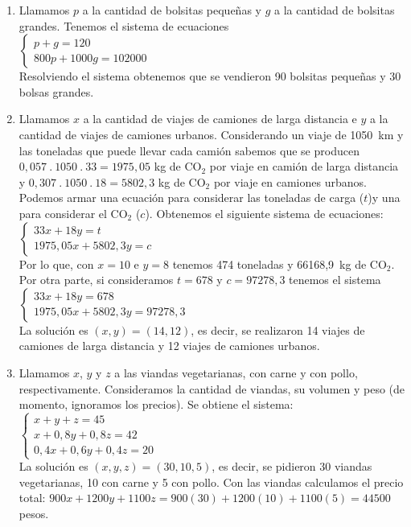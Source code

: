 \documentclass[a4paper]{article}
\begin{document}
\begin{enumerate}
\begin{enumerate} [label=(\alph*)]
		\item Llamamos $p$ a la cantidad de bolsitas pequeñas y $g$ a la cantidad de bolsitas grandes. Tenemos el sistema de ecuaciones \\ \vspace{2mm} $\left\{\begin{matrix} p+g=120 \\ 800p+1000g=102000 \end{matrix}\right.$ \\ Resolviendo el sistema obtenemos que se vendieron 90 bolsitas pequeñas y 30 bolsas grandes.
		\item Llamamos $x$ a la cantidad de viajes de camiones de larga distancia e $y$ a la cantidad de viajes de camiones urbanos. Considerando un viaje de 1050~km y las toneladas que puede llevar cada camión sabemos que se producen $0,057~.~1050~.~33=1975,05$ kg de CO$_2$ por viaje en camión de larga distancia y $0,307~.~1050~.~18=5802,3$ kg de CO$_2$ por viaje en camiones urbanos. Podemos armar una ecuación para considerar las toneladas de carga ($t$)y una para considerar el CO$_2$ ($c$). Obtenemos el siguiente sistema de ecuaciones: \\ \vspace{2mm} $\left\{\begin{matrix} 33x+18y=t \\ 1975,05x+5802,3y=c \end{matrix}\right.$ \\ Por lo que, con $x=10$ e $y=8$ tenemos 474 toneladas y 66168,9~kg de CO$_2$. Por otra parte, si consideramos $t=678$ y $c=97278,3$ tenemos el sistema \\ \vspace{2mm} $\left\{\begin{matrix} 33x+18y=678 \\ 1975,05x+5802,3y=97278,3 \end{matrix}\right.$ \\ La solución es $(x,y)=(14,12)$, es decir, se realizaron 14 viajes de camiones de larga distancia y 12 viajes de camiones urbanos.
		\item Llamamos $x$, $y$ y $z$ a las viandas vegetarianas, con carne y con pollo, respectivamente. Consideramos la cantidad de viandas, su volumen y peso (de momento, ignoramos los precios). Se obtiene el sistema: \\ \vspace{2mm} $\left\{\begin{matrix} x+y+z=45 \\ x+0,8y+0,8z=42 \\ 0,4x+0,6y+0,4z=20 \end{matrix}\right.$ \\ La solución es $(x,y,z)=(30,10,5)$, es decir, se pidieron 30 viandas vegetarianas, 10 con carne y 5 con pollo. Con las viandas calculamos el precio total: $900x+1200y+1100z=900(30)+1200(10)+1100(5)=44500$ pesos.

\end{enumerate}
\end{enumerate}
\end{document}
